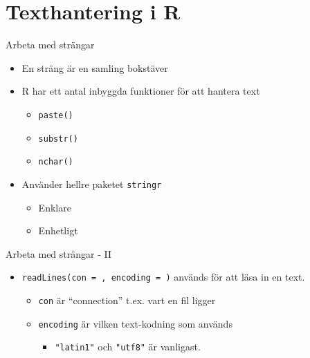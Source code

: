 \documentclass[
  11pt,
  ignorenonframetext,
  handout]{beamer}
\providecommand{\tightlist}{%
  \setlength{\itemsep}{0pt}\setlength{\parskip}{0pt}}
\begin{document}
\hypertarget{texthantering-i-r}{%
\section{Texthantering i R}\label{texthantering-i-r}}


\begin{frame}{Arbeta med strängar}
\protect\hypertarget{arbeta-med-struxe4ngar}{}
\begin{itemize}
\tightlist
\item
  En sträng är en samling bokstäver
\item
  R har ett antal inbyggda funktioner för att hantera text

  \begin{itemize}
  \tightlist
  \item
    \texttt{paste()}
  \item
    \texttt{substr()}
  \item
    \texttt{nchar()}
  \end{itemize}
\item
  Använder hellre paketet \texttt{stringr}

  \begin{itemize}
  \tightlist
  \item
    Enklare
  \item
    Enhetligt
  \end{itemize}
\end{itemize}
\end{frame}


\begin{frame}{Arbeta med strängar - II}
\protect\hypertarget{arbeta-med-struxe4ngar---ii}{}
\begin{itemize}
\tightlist
\item
  \texttt{readLines(con = , encoding = )} används för att läsa in en
  text.

  \begin{itemize}
  \tightlist
  \item
    \texttt{con} är ``connection'' t.ex. vart en fil ligger
  \item
    \texttt{encoding} är vilken text-kodning som används

    \begin{itemize}
    \tightlist
    \item
      \texttt{"latin1"} och \texttt{"utf8"} är vanligast.
    \end{itemize}
  \end{itemize}
\end{itemize}
\end{frame}
\end{document}
